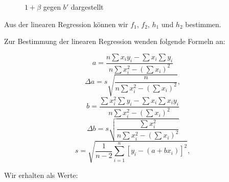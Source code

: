 \documentclass[11pt,a4paper]{article}
\begin{document}
\begin{figure}[h]
\centering
{}
\renewcommand\thefigure{420}
\caption[$1+{\beta}$ gegen $b'$ dargestellt]{$1+\beta$ gegen $b'$ dargestellt}
\label{Abb:b}
\end{figure}

Aus der linearen Regression k\"onnen wir $f_1$, $f_2$, $h_1$ und $h_2$ bestimmen. 

Zur Bestimmung der linearen Regression wenden folgende Formeln an:

\begin{equation}
a=\frac{n\sum x_iy_i-\sum x_i\sum y_i}{n\sum x_i^2-(\sum x_i)^2}
\end{equation}
\begin{equation}
\Delta a=s\sqrt{\frac{n}{n\sum x_i^2-(\sum x_i)^2}},
\end{equation}
\begin{equation}
b=\frac{\sum x_i^2\sum y_i-\sum x_i\sum x_iy_i}{n\sum x_i^2-(\sum x_i)^2}
\end{equation}
\begin{equation}
\Delta b=s\sqrt{\frac{\sum x_i^2}{n\sum x_i^2-(\sum x_i)^2}}
\end{equation}
\begin{equation}
s=\sqrt{\frac{1}{n-2}\sum^n_{i=1}[y_i-(a+bx_i)]^2},
\end{equation}

Wir erhalten als Werte:
\end{document}
